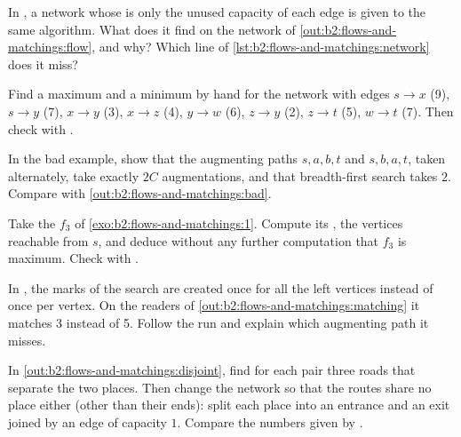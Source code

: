 \begin{exercise}[$\star$]\label{exo:b2:flows-and-matchings:2}
In , a network whose  is only the unused capacity of each edge is given to the
same algorithm. What  does it find on the network of \cref{out:b2:flows-and-matchings:flow}, and why? Which line of
\cref{lst:b2:flows-and-matchings:network} does it miss?
\end{exercise}

\begin{exercise}[$\star$]\label{exo:b2:flows-and-matchings:3}
Find a maximum  and a minimum  by hand for the network with edges $s \to x$ (9), $s \to y$ (7), $x \to y$ (3),
$x \to z$ (4), $y \to w$ (6), $z \to y$ (2), $z \to t$ (5), $w \to t$ (7). Then check with .
\end{exercise}

\begin{exercise}[$\star$]\label{exo:b2:flows-and-matchings:4}
In the bad example, show that the augmenting paths $s, a, b, t$ and $s, b, a, t$, taken alternately, take exactly $2C$
augmentations, and that breadth-first search takes $2$. Compare with \cref{out:b2:flows-and-matchings:bad}.
\end{exercise}

\begin{exercise}[$\star\star$]\label{exo:b2:flows-and-matchings:5}
Take the  $f_3$ of \cref{exo:b2:flows-and-matchings:1}. Compute its , the vertices reachable from
$s$, and deduce without any further computation that $f_3$ is maximum. Check with .
\end{exercise}

\begin{exercise}[$\star\star$]\label{exo:b2:flows-and-matchings:6}
In , the marks of the search are created once for all the left vertices instead of once per
vertex. On the readers of \cref{out:b2:flows-and-matchings:matching} it matches 3 instead of 5. Follow the run and
explain which augmenting path it misses.
\end{exercise}

\begin{exercise}[$\star\star$]\label{exo:b2:flows-and-matchings:7}
In \cref{out:b2:flows-and-matchings:disjoint}, find for each pair three roads that separate the two places. Then change
the network so that the routes share no place either (other than their ends): split each place into an entrance and an
exit joined by an edge of capacity $1$. Compare the numbers given by .
\end{exercise}

